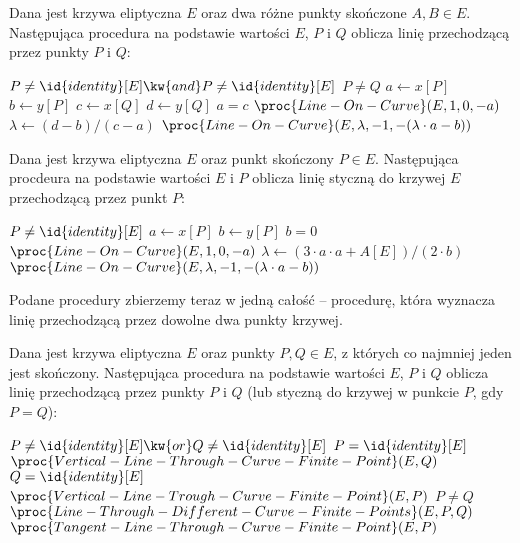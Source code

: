 \begin{algorithm}
Dana jest krzywa eliptyczna $E$
oraz dwa różne punkty skończone $A, B \in E$.
Następująca procedura
na podstawie wartości $E$, $P$ i $Q$
oblicza
linię przechodzącą przez punkty $P$ i $Q$:

\begin{codebox}
\li
    \Assert $P \neq \id{identity}[E] \kw{ and } P \neq \id{identity}[E]$
\li
    \Assert $P \neq Q$
\li
    $a \gets x[P]$
\li
    $b \gets y[P]$
\li
    $c \gets x[Q]$
\li
    $d \gets y[Q]$
\li
    \If $a = c$
\li
        \Then
            \Return $\proc{Line-On-Curve}(E, 1, 0, -a)$
\li
        \Else
            $\lambda \gets (d-b)/(c-a)$
\li
            \Return $\proc{Line-On-Curve}(E, \lambda, -1, -(\lambda\cdot a - b))$
        \End
\end{codebox}
\end{algorithm}

\begin{algorithm}
Dana jest krzywa eliptyczna $E$
oraz punkt skończony $P \in E$.
Następująca procdeura
na podstawie wartości $E$ i $P$
oblicza
linię styczną do krzywej $E$ przechodzącą przez punkt $P$:

\begin{codebox}
\li
    \Assert $P \neq \id{identity}[E]$
\li
    $a \gets x[P]$
\li
    $b \gets y[P]$
\li
    \If $b = 0$
\li
        \Then
            \Return $\proc{Line-On-Curve}(E, 1, 0, -a)$
\li
        \Else
            $\lambda \gets (3\cdot a \cdot a + A[E])/(2\cdot b)$
\li
            \Return $\proc{Line-On-Curve}(E, \lambda, -1, -(\lambda\cdot a - b))$
        \End
\end{codebox}
\end{algorithm}

Podane procedury zbierzemy teraz w jedną całość --
procedurę, która wyznacza linię przechodzącą przez dowolne dwa punkty krzywej.

\begin{algorithm}
Dana jest krzywa eliptyczna $E$
oraz punkty $P, Q \in E$,
z których co najmniej jeden jest skończony.
Następująca procedura
na podstawie wartości $E$, $P$ i $Q$
oblicza
linię przechodzącą przez punkty $P$ i $Q$
(lub styczną do krzywej w punkcie $P$, gdy $P = Q$):

\begin{codebox}
\li
    \Assert $P \neq \id{identity}[E] \kw{ or } Q \neq \id{identity}[E]$
\li
    \If $P = \id{identity}[E]$
\li
        \Then
            \Return $\proc{Vertical-Line-Through-Curve-Finite-Point}(E, Q)$
        \End
\li
    \If $Q = \id{identity}[E]$
\li
        \Then
            \Return $\proc{Vertical-Line-Trough-Curve-Finite-Point}(E, P)$
        \End
\li
    \If $P \neq Q$
\li
        \Then
            \Return $\proc{Line-Through-Different-Curve-Finite-Points}(E, P, Q)$
\li
        \Else
            \Return $\proc{Tangent-Line-Through-Curve-Finite-Point}(E, P)$
        \End
\end{codebox}
\end{algorithm}

